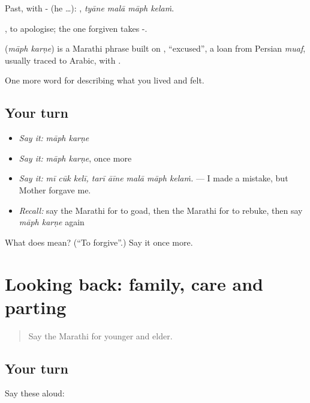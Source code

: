 Past, with - (he …):    , \emph{tyāne malā māph kelaṁ}.

 , to apologise; the one forgiven takes -.

\begin{cousinweb}
\textbf{ } (\emph{māph karṇe}) is a Marathi phrase built on , \textquotedblleft{}excused\textquotedblright{}, a loan from Persian \emph{muaf}, usually traced to Arabic, with .
\end{cousinweb}

\begin{grammarlens}[title={What you've built}]
One more word for describing what you lived and felt.
\end{grammarlens}

\subsection*{Your turn}
\begin{itemize}
\raggedright
  \item \emph{Say it:} \emph{māph karṇe}
  \item \emph{Say it:} \emph{māph karṇe}, once more
  \item \emph{Say it:} \emph{mī cūk kelī, tarī āīne malā māph kelaṁ.} — I made a mistake, but Mother forgave me.
  \item \emph{Recall:} say the Marathi for to goad, then the Marathi for to rebuke, then say \emph{māph karṇe} again
\end{itemize}

\begin{tcolorbox}[breakable,colback=teal!4,colframe=teal!35!black,title={Before you move on}]
What does   mean? (\textquotedblleft{}To forgive\textquotedblright{}.) Say it once more.
\end{tcolorbox}
\section[(dialogue)]{Looking back: family, care and parting}

\label{lesson:MR-R503-review-497-503}



\begin{quote}
Say the Marathi for younger and elder.
\end{quote}

\subsection*{Your turn}
Say these aloud:

